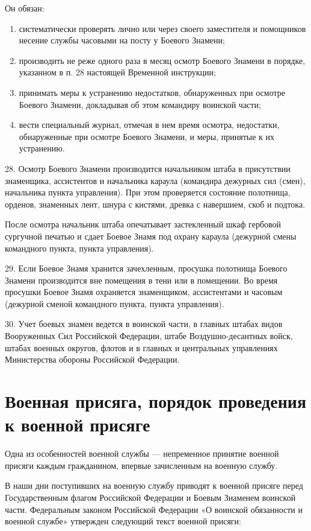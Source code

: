 \documentclass[12pt,a4paper]{report}
\begin{document}
Он обязан:
\begin{enumerate}
\item систематически проверять лично или через своего заместителя и помощников несение службы часовыми на посту у Боевого Знамени;
\item производить не реже одного раза в месяц осмотр Боевого Знамени в порядке, указанном в п. 28 настоящей Временной инструкции;
\item принимать меры к устранению недостатков, обнаруженных при осмотре Боевого Знамени, докладывая об этом командиру воинской части;
\item вести специальный журнал, отмечая в нем время осмотра, недостатки, обнаруженные при осмотре Боевого Знамени, и меры, принятые к их устранению.
\end{enumerate}
28. Осмотр Боевого Знамени производится начальником штаба в присутствии знаменщика, ассистентов и начальника караула (командира дежурных сил (смен), начальника пункта управления). При этом проверяется состояние полотнища, орденов, знаменных лент, шнура с кистями, древка с навершием, скоб и подтока.

После осмотра начальник штаба опечатывает застекленный шкаф гербовой сургучной печатью и сдает Боевое Знамя под охрану караула (дежурной смены командного пункта, пункта управления).

29. Если Боевое Знамя хранится зачехленным, просушка полотнища Боевого Знамени производится вне помещения в тени или в помещении. Во время просушки Боевое Знамя охраняется знаменщиком, ассистентами и часовым (дежурной сменой командного пункта, пункта управления).

30. Учет боевых знамен ведется в воинской части, в главных штабах видов Вооруженных Сил Российской Федерации, штабе Воздушно-десантных войск, штабах военных округов, флотов и в главных и центральных управлениях Министерства обороны Российской Федерации.

\section{Военная присяга, порядок проведения к военной присяге}
  Одна из особенностей военной службы — непременное принятие военной присяги каждым гражданином, впервые зачисленным на военную службу.
  
  В наши дни поступивших на военную службу приводят к военной присяге перед Государственным флагом Российской Федерации и Боевым Знаменем воинской части. Федеральным законом Российской Федерации «О воинской обязанности и военной службе» утвержден следующий текст военной присяги:
  
\end{document}
